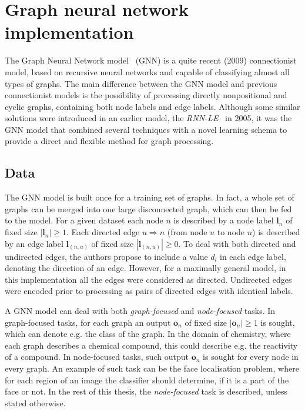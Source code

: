 
\chapter{Graph neural network implementation}

The Graph Neural Network model~\cite{scarselli2009graph} (GNN) is a quite recent (2009) connectionist model, based on recursive neural networks and capable of classifying almost all types of graphs. The main difference between the GNN model and previous connectionist models is the possibility of processing directly nonpositional and cyclic graphs, containing both node labels and edge labels. Although some similar solutions were introduced in an earlier model, the \emph{RNN-LE}~\cite{bianchini2005recursive} in 2005, it was the GNN model that combined several techniques with a novel learning schema to provide a direct and flexible method for graph processing.

\section{Data}
The GNN model is built once for a training set of graphs. In fact, a whole set of graphs can be merged into one large disconnected graph, which can then be fed to the model. For a given dataset each node $n$ is described by a node label $\bm{l}_n$ of fixed size $|\bm{l}_n| \geq 1$. Each directed edge $u \Rightarrow n$ (from node $u$ to node $n$) is described by an edge label $\bm{l}_{(n, u)}$ of fixed size $|\bm{l}_{(n, u)}| \geq 0$. To deal with both directed and undirected edges, the authors propose to include a value $d_l$ in each edge label, denoting the direction of an edge. However, for a maximally general model, in this implementation all the edges were considered as directed. Undirected edges were encoded prior to processing as pairs of directed edges with identical labels.

A GNN model can deal with both \emph{graph-focused} and \emph{node-focused} tasks. In graph-focused tasks, for each graph an output $\bm{o}_n$ of fixed size $|\bm{o}_n| \geq 1$ is sought, which can denote e.g. the class of the graph. In the domain of chemistry, where each graph describes a chemical compound, this could describe e.g. the reactivity of a compound. In node-focused tasks, such output $\bm{o}_n$ is sought for every node in every graph. An example of such task can be the face localisation problem, where for each region of an image the classifier should determine, if it is a part of the face or not. In the rest of this thesis, the \emph{node-focused} task is described, unless stated otherwise.

